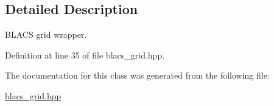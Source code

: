 \subsection{Detailed Description}
B\+L\+A\+C\+S grid wrapper. 

Definition at line 35 of file blacs\+\_\+grid.\+hpp.



The documentation for this class was generated from the following file\+:\begin{DoxyCompactItemize}
\item 
\hyperlink{blacs__grid_8hpp}{blacs\+\_\+grid.\+hpp}\end{DoxyCompactItemize}

